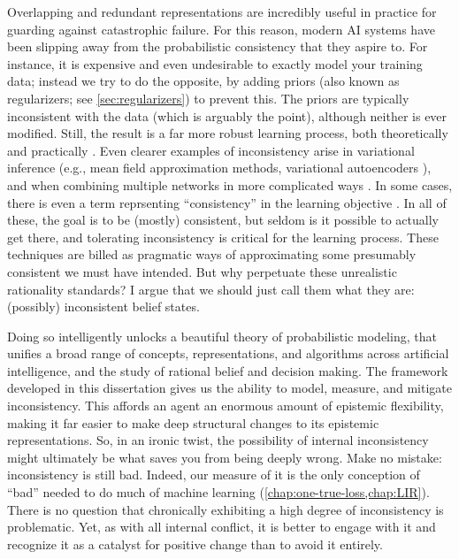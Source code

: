 Overlapping and redundant representations are incredibly useful in practice for guarding against catastrophic failure. 
For this reason, modern AI systems have been slipping away from the probabilistic consistency that they aspire to.
For instance, it is expensive and even undesirable to exactly model your training data; instead we try to do the opposite, by adding priors (also known as regularizers; see \cref{sec:regularizers}) to prevent this.
The priors are typically inconsistent with the data (which is arguably the point), although neither is ever modified. 
Still, the result is a far more robust learning process, both theoretically \cite{ftrl} and practically \cite{regularizers}.
%
Even clearer examples of inconsistency arise in variational inference
    (e.g., mean field approximation methods, variational autoencoders \cite{kingma2013autoencoding}),
    and when combining multiple networks 
        in more complicated ways \cite{}.
    In some cases, there is even a term reprsenting ``consistency'' in the learning objective \cite{cycle-gan}. 
In all of these, the goal is to be (mostly) consistent, but seldom is it possible to actually get there,
and tolerating inconsistency is critical for the learning process.
%
These techniques are billed
    as pragmatic ways of approximating
    some presumably consistent we must have intended.
But why perpetuate these unrealistic rationality standards?
I argue that we should just call them what they are: (possibly) inconsistent belief states.

Doing so intelligently unlocks a beautiful theory of probabilistic modeling, that unifies a broad range of concepts, representations, and algorithms across artificial intelligence, and 
    the study of rational belief and decision making.
The framework developed in this dissertation
gives us the ability to model, measure, and mitigate inconsistency.
This affords an agent an enormous amount of epistemic flexibility,
    making it far easier to make deep structural changes to its epistemic
    representations.
So, in an ironic twist, the possibility of internal inconsistency might ultimately be what saves you from being deeply wrong. 
%
Make no mistake: inconsistency is still bad.
Indeed, our measure of it is the only conception of ``bad'' needed to do much of machine learning (\cref{chap:one-true-loss,chap:LIR}).
There is no question that chronically exhibiting a high degree of inconsistency is problematic.
%
Yet, as with all internal conflict, it is better to engage with it and recognize it as a catalyst for positive change
than to avoid it entirely. 

